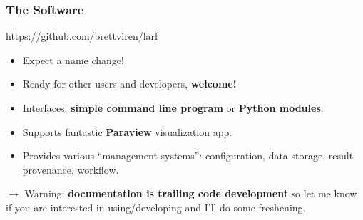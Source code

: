 \documentclass[xcolor=dvipsnames]{beamer}
\begin{document}
\begin{frame}
  \frametitle{The Software}
  \begin{center}
    \url{https://github.com/brettviren/larf}
  \end{center}

  \begin{itemize}
  \item Expect a name change!
  \item Ready for other users and developers, \textbf{welcome!}
  \item Interfaces: \textbf{simple command line program} or 
    \textbf{Python modules}.
  \item Supports fantastic \textbf{Paraview} visualization app.
  \item Provides various ``management systems'': configuration, data
    storage, result provenance, workflow.
  \end{itemize}

  $\rightarrow$ Warning: \textbf{documentation is trailing code
    development} so let me know if you are interested in
  using/developing and I'll do some freshening.

\end{frame}
\end{document}
